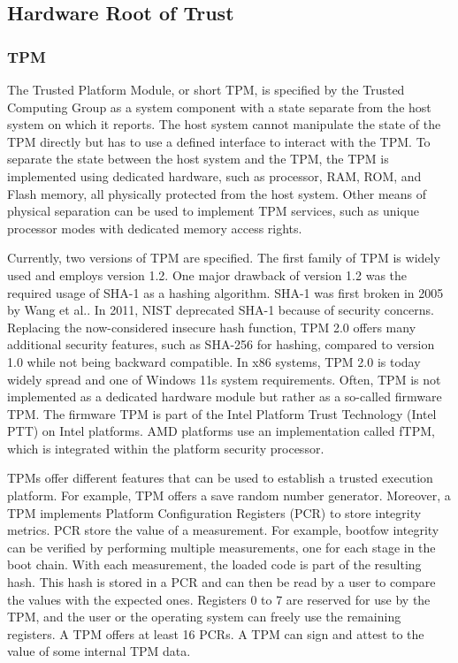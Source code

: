 
\subsection{Hardware Root of Trust}
\subsubsection{TPM}
The Trusted Platform Module, or short TPM, is specified by the Trusted Computing Group as a system component with
a state separate from the host system on which it reports.\cite{tpm_architecture} The host system cannot
manipulate the state of the TPM directly but has to use a defined interface to interact with the TPM. To separate
the state between the host system and the TPM, the TPM is implemented using dedicated hardware, such as processor, RAM,
ROM, and Flash memory, all physically protected from the host system. Other means of physical separation can be used to
implement TPM services, such as unique processor modes with dedicated memory access rights.

Currently, two versions of TPM are specified. The first family of TPM is widely used and employs version 1.2. One major drawback
of version 1.2 was the required usage of SHA-1 as a hashing algorithm. SHA-1 was first broken in 2005 by Wang
et al.\cite{wang2005collision}. In 2011, NIST deprecated SHA-1 because of security concerns. Replacing the now-considered
insecure hash function, TPM 2.0 offers many additional security features, such as SHA-256 for hashing,
compared to version 1.0 while not being backward compatible. In x86 systems, TPM 2.0 is today widely spread and one of
Windows 11s system requirements. Often, TPM is not implemented as a dedicated hardware module but rather as a so-called
firmware TPM. The firmware TPM is part of the Intel Platform Trust Technology (Intel PTT) on Intel platforms. AMD
platforms use an implementation called fTPM, which is integrated within the platform security processor.\cite{pirker2024brief}

TPMs offer different features that can be used to establish a trusted execution platform. For example, TPM offers a save random number
generator. Moreover, a TPM implements Platform Configuration Registers (PCR) to store integrity metrics.
PCR store the value of a measurement. For example, bootfow integrity can be verified by performing multiple measurements,
one for each stage in the boot chain. With each measurement, the loaded code is part of the resulting hash. This hash is
stored in a PCR and can then be read by a user to compare the values with the expected ones. Registers 0 to 7 are
reserved for use by the TPM, and the user or the operating system can freely use the remaining registers. A TPM offers
at least 16 PCRs.
A TPM can sign and attest to the value of some internal TPM data.

